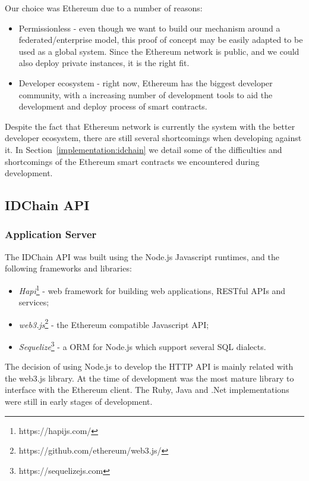 Our choice was Ethereum due to a number of reasons:

\begin{itemize}
  \item Permissionless - even though we want to build our mechanism around a federated/enterprise model, this proof of concept may be easily adapted to be used as a global system.
  Since the Ethereum network is public, and we could also deploy private instances, it is the right fit.
	\item Developer ecosystem - right now, Ethereum has the biggest developer community, with a increasing number of development tools to aid the development and deploy process of smart contracts.
\end{itemize}


Despite the fact that Ethereum network is currently the system with the better developer ecosystem, there are still several shortcomings when developing against it.
In Section~\ref{implementation:idchain} we detail some of the difficulties and shortcomings of the Ethereum smart contracts we encountered during development.

\subsection{IDChain API}

\subsubsection{Application Server}

The IDChain API was built using the Node.js Javascript runtimes, and the following frameworks and libraries:

\begin{itemize}
  \item \textit{Hapi}\footnote{https://hapijs.com/} - web framework for building web applications, RESTful APIs and services;
  \item \textit{web3.js}\footnote{https://github.com/ethereum/web3.js/} - the Ethereum compatible Javascript API;
  \item \textit{Sequelize}\footnote{https://sequelizejs.com} - a \ac{ORM} for Node.js which support several SQL dialects.
\end{itemize}

The decision of using Node.js to develop the HTTP API is mainly related with the web3.js library.
At the time of development was the most mature library to interface with the Ethereum client.
The Ruby, Java and .Net implementations were still in early stages of development.

